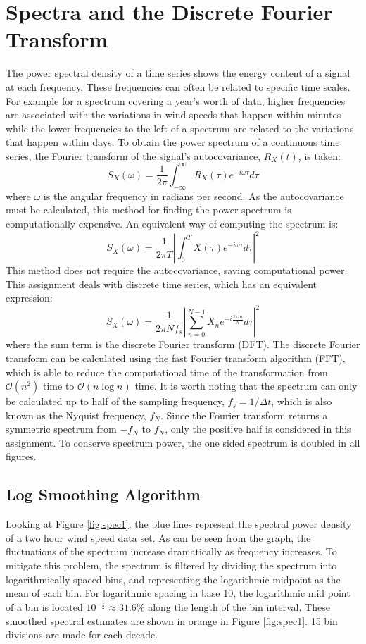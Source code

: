 \documentclass[11pt]{article}
\begin{document}
\section{Spectra and the Discrete Fourier Transform}
The power spectral density of a time series shows the energy content of a signal at each frequency. These frequencies can often be related to specific time scales. For example for a spectrum covering a year's worth of data, higher frequencies are associated with the variations in wind speeds that happen within minutes while the lower frequencies to the left of a spectrum are related to the variations that happen within days. To obtain the power spectrum of a continuous time series, the Fourier transform of the signal's autocovariance, $R_X(t)$, is taken:
$$S_X(\omega) = \frac{1}{2\pi}\int^\infty_{-\infty}R_X(\tau)e^{-i\omega\tau}d\tau$$
where $\omega$ is the angular frequency in radians per second. As the autocovariance must be calculated, this method for finding the power spectrum is computationally expensive. An equivalent way of computing the spectrum is:
$$S_X(\omega) = \frac{1}{2\pi T}\left|\int^T_{0}X(\tau)e^{-i\omega\tau}d\tau\right|^2$$
This method does not require the autocovariance, saving computational power. This assignment deals with discrete time series, which has an equivalent expression:
$$S_X(\omega) = \frac{1}{2\pi Nf_s}\left|\sum^{N-1}_{n=0}X_ne^{-i\frac{2\pi ln}{N}}d\tau\right|^2$$
where the sum term is the discrete Fourier transform (DFT). The discrete Fourier transform can be calculated using the fast Fourier transform algorithm (FFT), which is able to reduce the computational time of the transformation from $\mathcal{O}(n^2)$ time to $\mathcal{O}(n\log n)$ time.  
It is worth noting that the spectrum can only be calculated up to half of the sampling frequency, $f_s = 1/\Delta t$, which is also known as the Nyquist frequency, $f_N$. Since the Fourier transform returns a symmetric spectrum from $-f_N$ to $f_N$, only the positive half is considered in this assignment. To conserve spectrum power, the one sided spectrum is doubled in all figures.
\subsection{Log Smoothing Algorithm}
Looking at Figure \ref{fig:spec1}, the blue lines represent the spectral power density of a two hour wind speed data set. As can be seen from the graph, the fluctuations of the spectrum increase dramatically as frequency increases. To mitigate this problem, the spectrum is filtered by dividing the spectrum into logarithmically spaced bins, and representing the logarithmic midpoint as the mean of each bin. For logarithmic spacing in base 10, the logarithmic mid point of a bin is located $10^{-\frac{1}{2}} \approx 31.6\%$ along the length of the bin interval. These smoothed spectral estimates are shown in orange in Figure \ref{fig:spec1}. 15 bin divisions are made for each decade.
\end{document}
